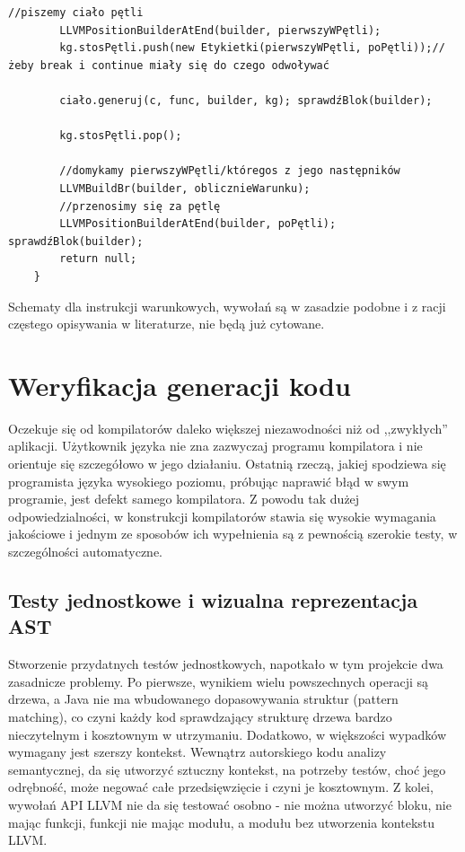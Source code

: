 \begin{lstlisting}[basicstyle=\scriptsize]
        //piszemy ciało pętli
        LLVMPositionBuilderAtEnd(builder, pierwszyWPętli);
        kg.stosPętli.push(new Etykietki(pierwszyWPętli, poPętli));//żeby break i continue miały się do czego odwoływać

        ciało.generuj(c, func, builder, kg); sprawdźBlok(builder);

        kg.stosPętli.pop();

        //domykamy pierwszyWPętli/któregos z jego następników
        LLVMBuildBr(builder, oblicznieWarunku);
        //przenosimy się za pętlę
        LLVMPositionBuilderAtEnd(builder, poPętli); sprawdźBlok(builder);
        return null;
    }
\end{lstlisting}

Schematy dla instrukcji warunkowych, wywołań są w zasadzie podobne i z racji częstego opisywania w literaturze, nie będą już cytowane.


\section{Weryfikacja generacji kodu}
Oczekuje się od kompilatorów daleko większej niezawodności niż od ,,zwykłych'' aplikacji\cite{waite_goos}. Użytkownik języka nie zna zazwyczaj programu kompilatora i nie orientuje się szczegółowo w jego działaniu. Ostatnią rzeczą, jakiej spodziewa się programista języka wysokiego poziomu, próbując naprawić błąd w swym programie, jest defekt samego kompilatora. Z powodu tak dużej odpowiedzialności, w konstrukcji kompilatorów stawia się wysokie wymagania jakościowe i jednym ze sposobów ich wypełnienia są z pewnością szerokie testy, w szczególności automatyczne.

\subsection{Testy jednostkowe i wizualna reprezentacja AST}
Stworzenie przydatnych testów jednostkowych, napotkało w tym projekcie dwa zasadnicze problemy. Po pierwsze, wynikiem wielu powszechnych operacji są drzewa, a Java nie ma wbudowanego dopasowywania struktur (pattern matching), co czyni każdy kod sprawdzający strukturę drzewa bardzo nieczytelnym i kosztownym w utrzymaniu. Dodatkowo, w większości wypadków wymagany jest szerszy kontekst. Wewnątrz autorskiego kodu analizy semantycznej, da się utworzyć sztuczny kontekst, na potrzeby testów, choć jego odrębność, może negować całe przedsięwzięcie i czyni je kosztownym. Z kolei, wywołań API LLVM nie da się testować osobno - nie można utworzyć bloku, nie mając funkcji, funkcji nie mając modułu, a modułu bez utworzenia kontekstu LLVM.

